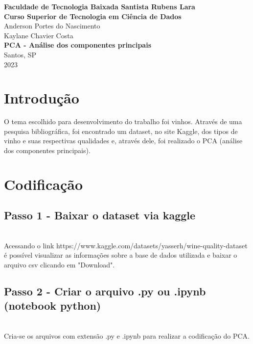 \documentclass[a4paper, 12pt]{article}
\begin{document}
\begin{center}
    \large
    \textbf{Faculdade de Tecnologia Baixada Santista Rubens Lara\\}
    \textbf{Curso Superior de Tecnologia em Ciência de Dados}
    \vspace{6.5cm}\\
    Anderson Portes do Nascimento\\Kaylane Chavier Costa\\
    \vspace{6cm}
    \textbf{PCA - Análise dos componentes principais}
    \\
    \vspace{6cm}
    Santos, SP\\
    2023
\end{center}

\newpage
    \onehalfspacing
    \section{Introdução}
    
    \par O tema escolhido para desenvolvimento do trabalho foi vinhos. Através de uma pesquisa bibliográfica, foi encontrado um dataset, no site Kaggle, dos tipos de vinho e suas respectivas qualidades e, através dele, foi realizado o PCA (análise dos componentes principais).



\section{Codificação}

\subsection{Passo 1 - Baixar o dataset via kaggle}

\\Acessando o link https://www.kaggle.com/datasets/yasserh/wine-quality-dataset é possível visualizar as informações sobre a base de dados utilizada e baixar o arquivo csv clicando em "Download".


\subsection{Passo 2 - Criar o arquivo .py ou .ipynb (notebook python)}

\\Cria-se os arquivos com extensão .py e .ipynb para realizar a codificação do PCA.
\end{document}
